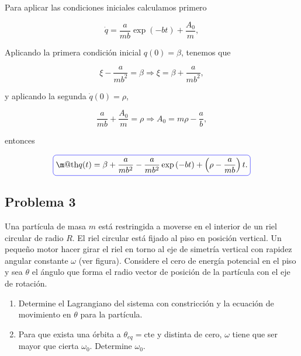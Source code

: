 \documentclass[a4paper,10pt]{article}
\makeatletter
\numberwithin{equation}{section}
\newcommand*{\boxcolor}{blue}
\renewcommand{\boxed}[1]{\textcolor{\boxcolor}{%
\tikz[baseline={([yshift=-1ex]current bounding box.center)}] \node [rectangle, minimum width=1ex,rounded corners,draw] {\normalcolor\m@th$\displaystyle#1$};}}
\makeatother
\begin{document}
Para aplicar las condiciones iniciales calculamos primero

\begin{equation}
 \dot{q} = \frac{a}{mb}\exp{(-bt)} + \frac{A_0}{m},
\end{equation}

Aplicando la primera condición inicial $q(0) = \beta$, tenemos que 

\begin{equation}
 \xi - \frac{a}{mb^2} = \beta \Rightarrow \xi = \beta + \frac{a}{mb^2},
\end{equation}

y aplicando la segunda $\dot{q}(0) = \rho$, 

\begin{equation}
\frac{a}{mb} + \frac{A_0}{m} = \rho \Rightarrow A_0 = m\rho - \frac{a}{b}, 
\end{equation}

entonces 

\begin{equation}
 \boxed{q(t) = \beta + \frac{a}{mb^2} - \frac{a}{mb^2}\exp{(-bt)} + 
 \left(\rho - \frac{a}{mb} \right)t.}
\end{equation}

\subsection{Problema 3}

Una partícula de masa $m$ está restringida a moverse en el interior de un riel circular 
de radio $R$. El riel circular está fijado al piso en posición vertical. Un pequeño 
motor hacer girar el riel en torno al eje de simetría vertical con rapidez angular 
constante $\omega$ (ver figura). Considere el cero de energía potencial en el piso y 
sea $\theta$ el ángulo que forma el radio vector de posición de la partícula con el 
eje de rotación.

\begin{enumerate}[label=\alph*)]
 \item Determine el Lagrangiano del sistema con constricción y la ecuación de movimiento 
 en $\theta$ para la partícula.
 \item Para que exista una órbita a $\theta_{eq}= \text{cte}$ y distinta de cero, $\omega$
 tiene que ser mayor que cierta $\omega_0$. Determine $\omega_0$.
\end{enumerate}

\vspace{.3cm}
\end{document}
